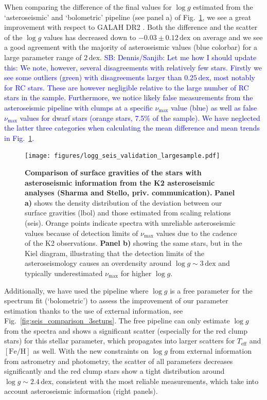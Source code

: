 \documentclass[fleqn,usenatbib,useAMS]{mnras}
\newcommand{\Teff}{$T_\mathrm{eff}$\xspace}
\newcommand{\logg}{$\log g$\xspace}
\newcommand{\feh}{$\mathrm{[Fe/H]}$\xspace}
\newcommand{\numax}{$\nu_\mathrm{max}$\xspace}
\newcommand\SB[1]{\textcolor{blue}{SB: #1}}
\begin{document}
When comparing the difference of the final values for \logg estimated from the `asteroseismic' and `bolometric' pipeline (see panel a) of Fig.~\ref{fig:all_seismic}, we see a great improvement with respect to GALAH DR2 \citep[see Fig.~17 from][]{Buder2018}. Both the difference and the scatter of the \logg values has decreased down to $-0.03\pm0.12\,\mathrm{dex}$ on average and we see a good agreement with the majority of asteroseismic values (blue colorbar) for a large parameter range of $2\,\mathrm{dex}$. \SB{Dennis/Sanjib: Let me how I should update this: We note, however, several disagreements with relatively few stars. Firstly we see some outliers (green) with disagreements larger than $0.25\,\mathrm{dex}$, most notably for RC stars. These are however negligible relative to the large number of RC stars in the sample. Furthermore, we notice likely false measurements from the asteroseismic pipeline with clumps at a specific \numax value (blue) as well as false \numax values for dwarf stars (orange stars, 7.5\% of the sample). We have neglected the latter three categories when calculating the mean difference and mean trends in Fig.~\ref{fig:all_seismic}.}

\begin{figure}
\centering
\texttt{[image: figures/logg\_seis\_validation\_largesample.pdf]}
\caption{
\textbf{Comparison of surface gravities of the stars with asteroseismic information from the K2 asteroseismic analyses (Sharma and Stello, priv. communication).}
\textbf{Panel a)} shows the density distribution of the deviation between our surface gravities (lbol) and those estimated from scaling relations (seis). Orange points indicate spectra with unreliable asteroseismic values because of detection limits of $\nu_\text{max}$ values due to the cadence of the K2 observations.
\textbf{Panel b)} showing the same stars, but in the Kiel diagram, illustrating that the detection limits of the asteroseismology causes an overdensity around $\log g \sim 3\,\mathrm{dex}$ and typically underestimated $\nu_\text{max}$ for higher $\log g$.
}
\label{fig:all_seismic}
\end{figure}

Additionally, we have used the pipeline where \logg is a free parameter for the spectrum fit (`bolometric') to assess the improvement of our parameter estimation thanks to the use of external information, see Fig.~\ref{fig:seis_comparison_3setups}. The free pipeline can only estimate \logg from the spectra and shows a significant scatter (especially for the red clump stars) for this stellar parameter, which propagates into larger scatters for \Teff and \feh as well. With the new constraints on \logg from external information from astrometry and photometry, the scatter of all parameters decreases significantly and the red clump stars show a tight distribution around $\log g \sim 2.4\,\mathrm{dex}$, consistent with the most reliable measurements, which take into account asteroseismic information (right panels).
\end{document}
